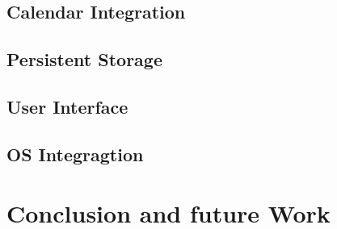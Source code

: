 \documentclass[11pt,a4paper]{scrreprt}
\begin{document}
\section{Calendar Integration} %
\label{sec:android_calendar}


\section{Persistent Storage} %
\label{sec:android_pers_storage}




\section{User Interface} %
\label{sec:user_interface}


\section{OS Integragtion} %
\label{sec:android_integration}


\chapter{Conclusion and future Work} %
\label{chp:platform_choice}


%
%
\end{document}
